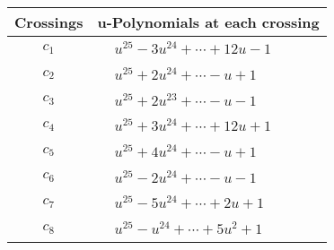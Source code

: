 \documentclass[1p]{elsarticle_modified}
\theoremstyle{definition}
\begin{document}
\begin{tabular}{m{50pt}|m{274pt}}
Crossings & \hspace{64pt}u-Polynomials at each crossing \\
\hline $$\begin{aligned}c_{1}\end{aligned}$$&$\begin{aligned}
&u^{25}-3 u^{24}+\cdots+12 u-1
\end{aligned}$\\
\hline $$\begin{aligned}c_{2}\end{aligned}$$&$\begin{aligned}
&u^{25}+2 u^{24}+\cdots- u+1
\end{aligned}$\\
\hline $$\begin{aligned}c_{3}\end{aligned}$$&$\begin{aligned}
&u^{25}+2 u^{23}+\cdots- u-1
\end{aligned}$\\
\hline $$\begin{aligned}c_{4}\end{aligned}$$&$\begin{aligned}
&u^{25}+3 u^{24}+\cdots+12 u+1
\end{aligned}$\\
\hline $$\begin{aligned}c_{5}\end{aligned}$$&$\begin{aligned}
&u^{25}+4 u^{24}+\cdots- u+1
\end{aligned}$\\
\hline $$\begin{aligned}c_{6}\end{aligned}$$&$\begin{aligned}
&u^{25}-2 u^{24}+\cdots- u-1
\end{aligned}$\\
\hline $$\begin{aligned}c_{7}\end{aligned}$$&$\begin{aligned}
&u^{25}-5 u^{24}+\cdots+2 u+1
\end{aligned}$\\
\hline $$\begin{aligned}c_{8}\end{aligned}$$&$\begin{aligned}
&u^{25}- u^{24}+\cdots+5 u^2+1
\end{aligned}$\\

\end{tabular}
\end{document}
